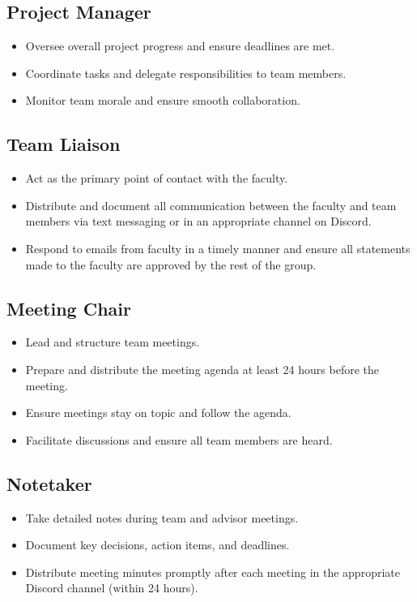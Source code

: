 \documentclass{article}
\begin{document}
\subsection{Project Manager} 
  \begin{itemize}
    \item Oversee overall project progress and ensure deadlines are met.
    \item Coordinate tasks and delegate responsibilities to team members.
    \item Monitor team morale and ensure smooth collaboration.
  \end{itemize}

\subsection{Team Liaison}
  \begin{itemize}
    \item Act as the primary point of contact with the faculty.
    \item Distribute and document all communication between the faculty and team members via text messaging or in an appropriate channel on Discord.
    \item Respond to emails from faculty in a timely manner and ensure all statements made to the faculty are approved by the rest of the group.
  \end{itemize}

\subsection{Meeting Chair} 
  \begin{itemize}
    \item Lead and structure team meetings.
    \item Prepare and distribute the meeting agenda at least 24 hours before the meeting.
    \item Ensure meetings stay on topic and follow the agenda.
    \item Facilitate discussions and ensure all team members are heard.
  \end{itemize}

\subsection{Notetaker}
  \begin{itemize}
    \item Take detailed notes during team and advisor meetings.
    \item Document key decisions, action items, and deadlines.
    \item Distribute meeting minutes promptly after each meeting in the appropriate Discord channel (within 24 hours).
  \end{itemize}
\end{document}
